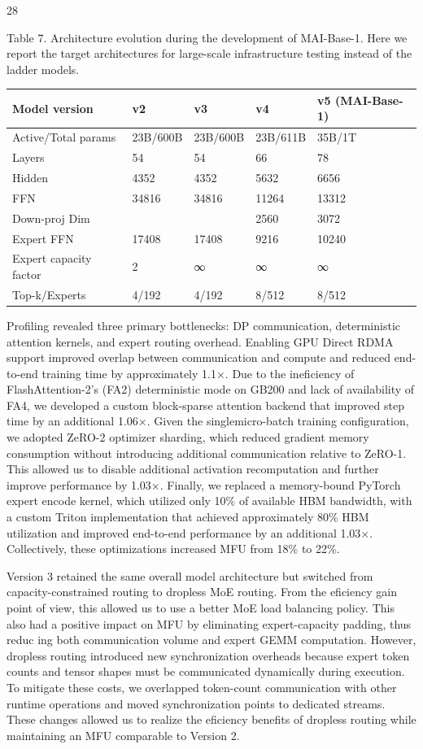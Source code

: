 \documentclass[
  10
]{article}
\newcounter{none} %
\begin{document}
28

Table 7. Architecture evolution during the development of MAI-Base-1.
Here we report the target architectures for large-scale infrastructure
testing instead of the ladder models.

{\def\LTcaptype{none} %
\begin{longtable}[]{@{}|l|l|l|l|l|@{}}
\toprule\noalign{}
\endhead
\bottomrule\noalign{}
\endlastfoot
\hline
Model version & v2 & v3 & v4 & v5 (MAI-Base-1) \\
\hline
Active/Total params & 23B/600B & 23B/600B & 23B/611B & 35B/1T \\
\hline
Layers & 54 & 54 & 66 & 78 \\
\hline
Hidden & 4352 & 4352 & 5632 & 6656 \\
\hline
FFN & 34816 & 34816 & 11264 & 13312 \\
\hline
Down-proj Dim & & & 2560 & 3072 \\
\hline
Expert FFN & 17408 & 17408 & 9216 & 10240 \\
\hline
Expert capacity factor & 2 & ∞ & ∞ & ∞ \\
\hline
Top-k/Experts & 4/192 & 4/192 & 8/512 & 8/512 \\
\hline
\end{longtable}
}

Profiling revealed three primary bottlenecks: DP communication,
deterministic attention kernels, and expert routing overhead. Enabling
GPU Direct RDMA support improved overlap between communication and
compute and reduced end-to-end training time by approximately 1.1×. Due
to the ineficiency of FlashAttention-2's (FA2) deterministic mode on
GB200 and lack of availability of FA4, we developed a custom
block-sparse attention backend that improved step time by an additional
1.06×. Given the singlemicro-batch training configuration, we adopted
ZeRO-2 optimizer sharding, which reduced gradient memory consumption
without introducing additional communication relative to ZeRO-1. This
allowed us to disable additional activation recomputation and further
improve performance by 1.03×. Finally, we replaced a memory-bound
PyTorch expert encode kernel, which utilized only 10\% of available HBM
bandwidth, with a custom Triton implementation that achieved
approximately 80\% HBM utilization and improved end-to-end performance
by an additional 1.03×. Collectively, these optimizations increased MFU
from 18\% to 22\%.

Version 3 retained the same overall model architecture but switched from
capacity-constrained routing to dropless MoE routing. From the eficiency
gain point of view, this allowed us to use a better MoE load balancing
policy. This also had a positive impact on MFU by eliminating
expert-capacity padding, thus reduc ing both communication volume and
expert GEMM computation. However, dropless routing introduced new
synchronization overheads because expert token counts and tensor shapes
must be communicated dynamically during execution. To mitigate these
costs, we overlapped token-count communication with other runtime
operations and moved synchronization points to dedicated streams. These
changes allowed us to realize the eficiency benefits of dropless routing
while maintaining an MFU comparable to Version 2.
\end{document}
